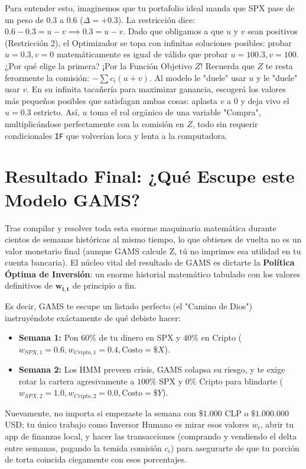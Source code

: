 \documentclass[11pt,a4paper]{article}
\begin{document}
\vspace{1mm}
Para entender esto, imaginemos que tu portafolio ideal manda que SPX pase de un peso de $0.3$ a $0.6$ ($\Delta = +0.3$). La restricción dice: $0.6 - 0.3 = u - v \implies 0.3 = u - v$. 
Dado que obligamos a que $u$ y $v$ sean positivos (Restricción 2), el Optimizador se topa con infinitas soluciones posibles: probar $u=0.3, v=0$ matemáticamente es igual de válido que probar $u=100.3, v=100$. ¿Por qué elige la primera? ¡Por la Función Objetivo $Z$! Recuerda que $Z$ te resta ferozmente la comisión: $- \sum c_i(u+v)$. Al modelo le "duele" usar $u$ y le "duele" usar $v$. En su infinita tacañería para maximizar ganancia, escogerá los valores más pequeños posibles que satisfagan ambas cosas: aplasta $v$ a $0$ y deja vivo el $u=0.3$ estricto. Así, $u$ toma el rol orgánico de una variable "Compra", multiplicándose perfectamente con la comisión en $Z$, todo sin requerir condicionales \texttt{IF} que volverían loca y lenta a la computadora.

\section{Resultado Final: ¿Qué Escupe este Modelo GAMS?}
Tras compilar y resolver toda esta enorme maquinaria matemática durante cientos de semanas históricas al mismo tiempo, lo que obtienes de vuelta no es un valor monetario final (aunque GAMS calcule Z, tú no imprimes esa utilidad en tu cuenta bancaria). El núcleo vital del resultado de GAMS es dictarte la \textbf{Política Óptima de Inversión}: un enorme historial matemático tabulado con los valores definitivos de $\mathbf{w_{i,t}}$ de principio a fin.

Es decir, GAMS te escupe un listado perfecto (el "Camino de Dios") instruyéndote exáctamente de qué debiste hacer:
\begin{itemize}
    \item \textbf{Semana 1:} Pon $60\%$ de tu dinero en SPX y $40\%$ en Cripto ($w_{SPX,1}=0.6, w_{Cripto,1}=0.4, \text{Costo}=\$X$).
    \item \textbf{Semana 2:} Los HMM preveen crisis, GAMS colapsa su riesgo, y te exige rotar la cartera agresivamente a $100\%$ SPX y $0\%$ Cripto para blindarte ($w_{SPX,2}=1.0, w_{Cripto,2}=0.0, \text{Costo}=\$Y$).
\end{itemize}
Nuevamente, no importa si empezaste la semana con $\$1.000$ CLP o $\$1.000.000$ USD; tu único trabajo como Inversor Humano es mirar esos valores $w_{t}$, abrir tu app de finanzas local, y hacer las transacciones (comprando y vendiendo el delta entre semanas, pagando la temida comisión $c_i$) para asegurarte de que tu porción de torta coincida ciegamente con esos porcentajes.
\end{document}
